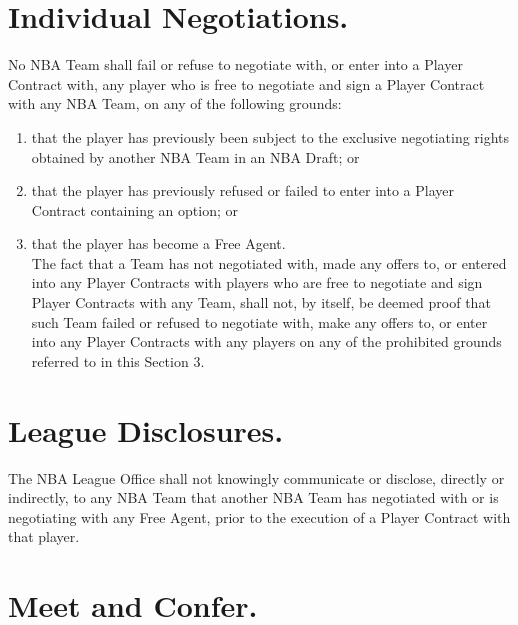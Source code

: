 \documentclass[
]{book}
\providecommand{\tightlist}{%
  \setlength{\itemsep}{0pt}\setlength{\parskip}{0pt}}
\begin{document}
\hypertarget{individual-negotiations.}{%
\section{Individual Negotiations.}\label{individual-negotiations.}}

No NBA Team shall fail or refuse to negotiate with, or enter into a Player Contract with, any player who is free to negotiate and sign a Player Contract with any NBA Team, on any of the following grounds:

\begin{enumerate}
\def\labelenumi{(\alph{enumi})}
\tightlist
\item
  that the player has previously been subject to the exclusive negotiating rights obtained by another NBA Team in an NBA Draft; or
\item
  that the player has previously refused or failed to enter into a Player Contract containing an option; or
\item
  that the player has become a Free Agent.\\
  The fact that a Team has not negotiated with, made any offers to, or entered into any Player Contracts with players who are free to negotiate and sign Player Contracts with any Team, shall not, by itself, be deemed proof that such Team failed or refused to negotiate with, make any offers to, or enter into any Player Contracts with any players on any of the prohibited grounds referred to in this Section 3.
\end{enumerate}

\hypertarget{league-disclosures.}{%
\section{League Disclosures.}\label{league-disclosures.}}

The NBA League Office shall not knowingly communicate or disclose, directly or indirectly, to any NBA Team that another NBA Team has negotiated with or is negotiating with any Free Agent, prior to the execution of a Player Contract with that player.

\hypertarget{meet-and-confer.}{%
\section{Meet and Confer.}\label{meet-and-confer.}}
\end{document}
